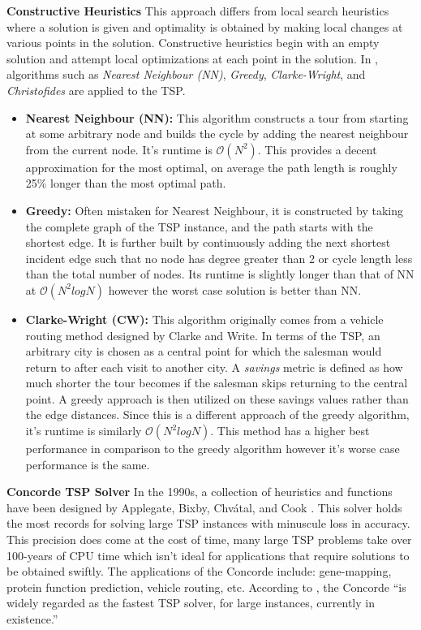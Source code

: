 \documentclass[]{UCD_CS_FYP_Report}
\begin{document}
\textbf{Constructive Heuristics}
This approach differs from local search heuristics where a solution is given and optimality is obtained by making local changes at various points in the solution. Constructive heuristics begin with an empty solution and attempt local optimizations at each point in the solution. In \cite{JohnMcGe97}, algorithms such as \textit{Nearest Neighbour (NN)}, \textit{Greedy}, \textit{Clarke-Wright}, and
\textit{Christofides} are applied to the TSP. 
\begin{itemize}
  \item \textbf{Nearest Neighbour (NN): }This algorithm constructs a tour from starting at some arbitrary node and builds the cycle by adding the nearest neighbour from the current node. It's runtime is $\mathcal{O}(N^2)$. This provides a decent approximation for the most optimal, on average the path length is roughly 25\% longer than the most optimal path.
  \item \textbf{Greedy: }Often mistaken for Nearest Neighbour, it is constructed by taking the complete graph of the TSP instance, and the path starts with the shortest edge. It is further built by continuously adding the next shortest incident edge such that no node has degree greater than 2 or cycle length less than the total number of nodes. Its runtime is slightly longer than that of NN at $\mathcal{O}(N^2logN)$ however the worst case solution is better than NN.
  \item \textbf{Clarke-Wright (CW): }This algorithm originally comes from a vehicle routing method designed by Clarke and Write\cite{Clarke:1964:SVC:2769344.2769349}. In terms of the TSP, an arbitrary city is chosen as a central point for which the salesman would return to after each visit to another city. A \textit{savings} metric is defined as how much shorter the tour becomes if the salesman skips returning to the central point. A greedy approach is then utilized on these savings values rather than the edge distances. Since this is a different approach of the greedy algorithm, it's runtime is similarly $\mathcal{O}(N^2logN)$. This method has a higher best performance in comparison to the greedy algorithm however it's worse case performance is the same.
\end{itemize}

\textbf{Concorde TSP Solver}
In the 1990s, a collection of heuristics and functions have been designed by Applegate, Bixby, Chvátal, and Cook \cite{davidapplegate2007}. This solver holds the most records for solving large TSP instances with minuscule loss in accuracy. This precision does come at the cost of time, many large TSP problems take over 100-years of CPU time which isn't ideal for applications that require solutions to be obtained swiftly. The applications of the Concorde include: gene-mapping\cite{10.1093/jhered/esg012}, protein function prediction\cite{Johnson2006}, vehicle routing\cite{ApplegateVPR}, etc. According to \cite{MULDER2003827}, the Concorde “is widely regarded as the fastest TSP solver, for large instances, currently in existence.”
\end{document}
